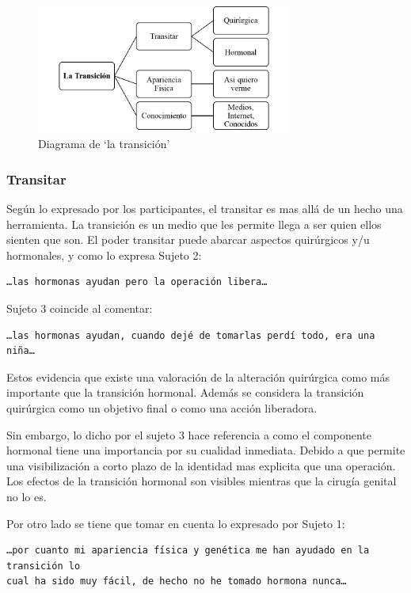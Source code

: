 \begin{figure}
    \centering
    \includegraphics[width=0.75\textwidth]{transicion}
    \caption{Diagrama de ‘la transición’}\label{fig:transicion}
\end{figure}

\subsubsection{Transitar}

Según lo expresado por los participantes, el transitar es mas allá de un hecho
una herramienta. La transición es un medio que les permite llega a ser quien
ellos sienten que son. El poder transitar puede abarcar aspectos quirúrgicos y/u
hormonales, y como lo expresa Sujeto 2:

\begin{verbatim}
…las hormonas ayudan pero la operación libera…
\end{verbatim}

Sujeto 3 coincide al comentar:

\begin{verbatim}
…las hormonas ayudan, cuando dejé de tomarlas perdí todo, era una niña…
\end{verbatim}

Estos evidencia que existe una valoración de la alteración quirúrgica como más
importante que la transición hormonal. Además se considera la transición
quirúrgica como un objetivo final o como una acción liberadora.

Sin embargo, lo dicho por el sujeto 3 hace referencia a como el componente
hormonal tiene una importancia por su cualidad inmediata. Debido a que permite
una visibilización a corto plazo de la identidad mas explicita que una
operación. Los efectos de la transición hormonal son visibles mientras que la
cirugía genital no lo es.

Por otro lado se tiene que tomar en cuenta lo expresado por Sujeto 1:

\begin{verbatim}
…por cuanto mi apariencia física y genética me han ayudado en la transición lo
cual ha sido muy fácil, de hecho no he tomado hormona nunca…
\end{verbatim}

